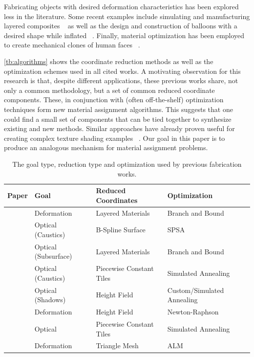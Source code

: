 \documentclass[annual]{acmsiggraph}
\begin{document}
Fabricating objects with desired deformation characteristics has been explored less in the literature. Some recent examples include simulating and manufacturing layered composites ~\cite{Bickel:2010} as well as the design and construction of balloons with a desired shape while inflated ~\cite{sko:2012}. Finally, material optimization has been employed to create mechanical clones of human faces ~\cite{Bickel:2012}.

\autoref{tb:algorithms} shows the coordinate reduction methods as well as the optimization schemes used in all cited works. A motivating observation for this research is that, despite different applications, these previous works share, not only a common methodology, but a set of common reduced coordinate components. These, in conjunction with (often off-the-shelf) optimization techniques form new material assignment algorithms. This suggests that one could find a small set of components that can be tied together to synthesize existing and new methods. Similar approaches have already proven useful for creating complex texture shading examples ~\cite{Cook1984}. Our goal in this paper is to produce an analogous mechanism for material assignment problems. 
\begin{table}[htp]
\centering
\caption{The goal type, reduction type and optimization used by previous fabrication works.}
\begin{tabular}{clll}
\hline
\textbf{Paper} & \textbf{Goal} & \textbf{Reduced Coordinates}  & \textbf{Optimization} \\ 
\hline
~\cite{Bickel:2010}& Deformation & Layered Materials  & Branch and Bound \\
~\cite{Finckh:2010} & Optical (Caustics) & B-Spline Surface & SPSA \\
~\cite{Hasan:2010}& Optical (Subsurface) & Layered Materials & Branch and Bound\\ 
~\cite{Marios:2011} & Optical (Caustics) & Piecewise Constant Tiles & Simulated Annealing \\
~\cite{Bermano:2012} & Optical (Shadows) & Height Field & Custom/Simulated Annealing \\
~\cite{Bickel:2012} & Deformation &  Height Field &  Newton-Raphson \\
~\cite{Papas:2012} & Optical & Piecewise Constant Tiles & Simulated Annealing \\
~\cite{sko:2012}& Deformation & Triangle Mesh & ALM \\
\hline
\end{tabular}
\label{tb:algorithms}
\end{table}
\end{document}
